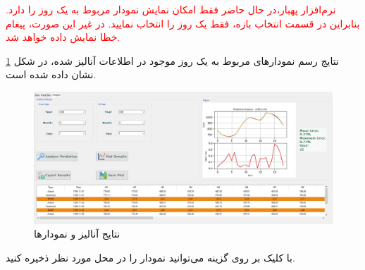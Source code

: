 \documentclass[a4paper,20pt,dvipsnames, usenames]{extbook}
\begin{document}
\textcolor{red}{نرم‌افزار پهبار،‌در حال حاضر فقط امکان نمایش نمودار مربوط به یک روز را دارد. بنابراین در قسمت انتخاب بازه، فقط یک روز را انتخاب نمایید. در غیر این صورت، پیغام خطا نمایش داده خواهد شد.}

نتایج رسم نمودارهای مربوط به یک روز موجود در اطلاعات آنالیز شده،‌ در شکل
\ref{fig38}
نشان داده شده است.

\begin{figure}[!h]
	\centering
	\includegraphics[width = \textwidth]{fig34}
	\caption{نتایج آنالیز و نمودارها}
	\label{fig38}
\end{figure}

با کلیک بر روی گزینه
می‌توانید نمودار را در محل مورد نظر ذخیره کنید.
\end{document}
